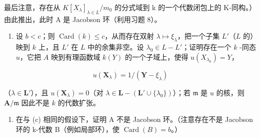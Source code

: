 最后注意，存在从 \(K[X_{\lambda}]_{\lambda \in L}/m_{0}\) 的分式域到 k 的一个代数闭包上的 K-同构。）由此推出，此时 A 是 Jacobson 环（利用习题 8）。

\begin{enumerate}
\def\labelenumi{(\alph{enumi})}
\setcounter{enumi}{2}
\tightlist
\item
  设 \(b < c\)；则 \(\operatorname{Card}(k) \leqslant c\)，从而存在双射 \(\lambda \mapsto \xi_{\lambda}\)，把一个子集 \(L'\)（\(L\) 的）映到 \(k\) 上，且 \(L'\) 在 \(L\) 中的余集非空。设 \(\lambda_0 \in L - L'\)；证明存在一个 \(k\) -同态 \(u\)，它把 \(A\) 映到有理函数域 \(k(Y)\) 的一个子域上，使得 \(u(X_{\lambda_0}) = Y\)，
\end{enumerate}

\[
u (\mathbf {X} _ {\lambda}) = 1 / (\mathbf {Y} - \xi_ {\lambda})
\]

（\(\lambda \in \mathbf{L}'\)），且 \(u(\mathbf{X}_{\lambda}) = 0\)（对 \(\lambda \in \mathbf{L} - (\mathbf{L}' \cup \{\lambda_0\})\)）；若 \(\mathfrak{m}\) 是 \(u\) 的核，则 \(\mathbf{A} / \mathfrak{m}\) 因此不是 \(k\) 的代数扩张。

\begin{enumerate}
\def\labelenumi{(\alph{enumi})}
\setcounter{enumi}{3}
\tightlist
\item
  在与 (c) 相同的假设下，证明 A 不是 Jacobson 环。（注意存在不是 Jacobson 环的 k-代数 B（例如局部环），使 \(\operatorname{Card}(B) = b\)。）
\end{enumerate}


